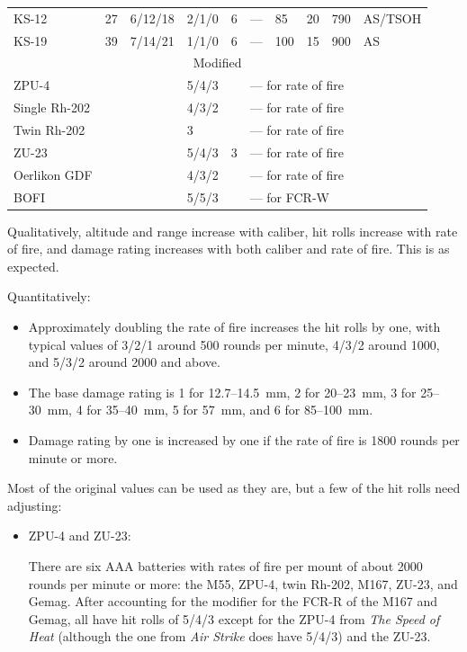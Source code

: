 {\begin{center}
\begin{tabular}{lrlllllrrl}
            KS-12&27&6/12/18&2/1/0&6&---&85&20&790&AS/TSOH\\
            KS-19&39&7/14/21&1/1/0&6&---&100&15&900&AS\\
            \midrule
            \multicolumn{10}{c}{Modified}\\
            \midrule
            ZPU-4&&&5/4/3&&\multicolumn{5}{l}{--- for rate of fire}\\
            Single Rh-202&&&4/3/2&&\multicolumn{5}{l}{--- for rate of fire}\\
            Twin Rh-202&& &3 & &\multicolumn{5}{l}{--- for rate of fire}\\
            ZU-23&&&5/4/3&3&\multicolumn{5}{l}{--- for rate of fire}\\
            Oerlikon GDF&&&4/3/2&&\multicolumn{5}{l}{--- for rate of fire}\\
            BOFI&&&5/5/3&&\multicolumn{5}{l}{--- for FCR-W}\\
            \bottomrule
        \end{tabular}
        \medskip
    \end{center}

    Qualitatively, altitude and range increase with caliber, hit rolls increase with rate of fire, and damage rating increases with both caliber and rate of fire.
    This is as expected.

    Quantitatively:
    \begin{itemize}
        \item Approximately doubling the rate of fire increases the hit rolls by one, with typical values of 3/2/1 around 500 rounds per minute, 4/3/2 around 1000, and 5/3/2 around 2000 and above.
        \item The base damage rating is 1 for 12.7--14.5~mm, 2 for 20--23~mm, 3 for 25--30~mm, 4 for 35--40~mm, 5 for 57~mm, and 6 for 85--100~mm.
        \item Damage rating by one is increased by one if the rate of fire is 1800 rounds per minute or more.
    \end{itemize}

    Most of the original values can be used as they are, but a few of the hit rolls need adjusting:
    \begin{itemize}
        \item ZPU-4 and ZU-23:

            There are six AAA batteries with rates of fire per mount of about 2000 rounds per minute or more: the M55, ZPU-4, twin Rh-202, M167, ZU-23, and Gemag. After accounting for the  modifier for the FCR-R of the M167 and Gemag, all have hit rolls of 5/4/3 except for the ZPU-4 from \emph{The Speed of Heat} (although the one from \emph{Air Strike} does have 5/4/3) and the ZU-23.


\end{itemize}}
